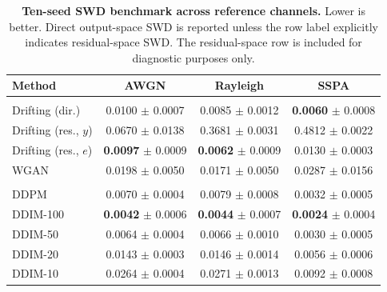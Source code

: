 \begin{table}[t]
\centering
\caption{\textbf{Ten-seed SWD benchmark across reference channels.} Lower is better. Direct output-space SWD is reported unless the row label explicitly indicates residual-space SWD\@. The residual-space row is included for diagnostic purposes only.}
\label{tab:benchmark-all-channels}
\tablefontsize
\begin{tabular}{@{}lccc@{}}
\toprule
Method & AWGN & Rayleigh & SSPA \\
\midrule
\rowcolor[gray]{0.9} \multicolumn{4}{l}{\textit{One-shot generators}} \\
\headspace Drifting (dir.) & 0.0100 $\pm$ 0.0007 & 0.0085 $\pm$ 0.0012 & \textbf{0.0060} $\pm$ 0.0008 \\
\headspace Drifting (res., $y$) & 0.0670 $\pm$ 0.0138 & 0.3681 $\pm$ 0.0031 & 0.4812 $\pm$ 0.0022 \\
\headspace Drifting (res., $e$) & \textbf{0.0097} $\pm$ 0.0009 & \textbf{0.0062} $\pm$ 0.0009 & 0.0130 $\pm$ 0.0003 \\
\headspace WGAN & 0.0198 $\pm$ 0.0050 & 0.0171 $\pm$ 0.0050 & 0.0287 $\pm$ 0.0156 \\
\midrule
\rowcolor[gray]{0.9} \multicolumn{4}{l}{\textit{Diffusion samplers}} \\
\headspace DDPM & 0.0070 $\pm$ 0.0004 & 0.0079 $\pm$ 0.0008 & 0.0032 $\pm$ 0.0005 \\
\headspace DDIM-100 & \textbf{0.0042} $\pm$ 0.0006 & \textbf{0.0044} $\pm$ 0.0007 & \textbf{0.0024} $\pm$ 0.0004 \\
\headspace DDIM-50 & 0.0064 $\pm$ 0.0004 & 0.0066 $\pm$ 0.0010 & 0.0030 $\pm$ 0.0005 \\
\headspace DDIM-20 & 0.0143 $\pm$ 0.0003 & 0.0146 $\pm$ 0.0014 & 0.0056 $\pm$ 0.0006 \\
\headspace DDIM-10 & 0.0264 $\pm$ 0.0004 & 0.0271 $\pm$ 0.0013 & 0.0092 $\pm$ 0.0008 \\
\bottomrule
\end{tabular}
\end{table}
